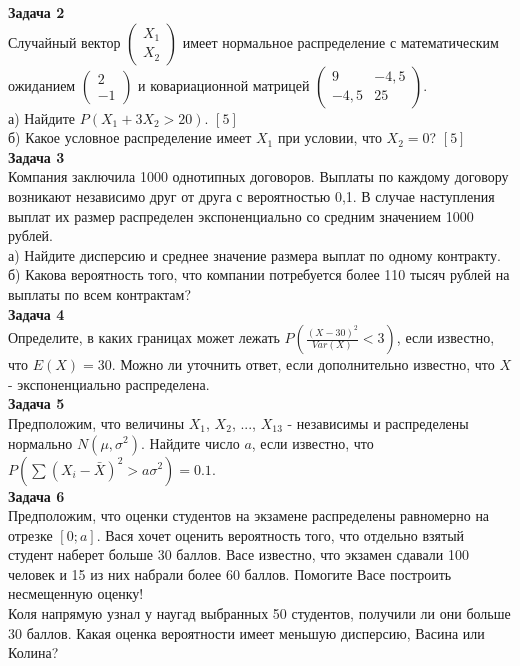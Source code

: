 \documentclass[pdftex,12pt,a4paper]{article}
\begin{document}
\textbf{Задача 2} \\ %
Случайный вектор  $\left(\begin{array}{c}
{X_{1} } \\ {X_{2} }
\end{array}\right)$  имеет нормальное распределение с
математическим ожиданием  $\left(\begin{array}{c} {2} \\ {-1}
\end{array}\right)$  и ковариационной матрицей
$\left(\begin{array}{cc} {9} & {-4,5} \\ {-4,5} & {25}
\end{array}\right)$. \\
а) Найдите  $P\left(X_{1} +3X_{2} >20\right)$. $[5]$ \\
б) Какое условное распределение имеет $X_{1}$ при условии, что $X_{2}=0$? $[5]$ \\


\textbf{Задача 3} \\ %
Компания заключила 1000 однотипных договоров. Выплаты по каждому договору возникают независимо друг от друга с вероятностью 0,1. В случае наступления выплат их размер распределен экспоненциально со средним значением 1000 рублей. \\
а) Найдите дисперсию и среднее значение размера выплат по одному контракту. \\
б) Какова вероятность того, что компании потребуется более 110 тысяч рублей на выплаты по всем контрактам? \\

\textbf{Задача 4} \\ %
Определите, в каких границах может лежать $P(\frac{(X-30)^{2}}{Var(X)}<3)$, если известно, что $E(X)=30$. Можно ли уточнить ответ, если дополнительно известно, что $X$ - экспоненциально распределена. \\

\textbf{Задача 5} \\ %
Предположим, что величины $X_{1}$, $X_{2}$, ..., $X_{13}$ - независимы и распределены нормально $N(\mu,\sigma^{2})$. Найдите число $a$, если известно, что $P( \sum (X_{i}-\bar{X})^{2}>a\sigma^{2})=0.1$. \\

\textbf{Задача 6} \\
Предположим, что оценки студентов на экзамене распределены равномерно на отрезке $[0;a]$. Вася хочет оценить вероятность того, что отдельно взятый студент наберет больше 30 баллов. Васе известно, что экзамен сдавали 100 человек и 15 из них набрали более 60 баллов. Помогите Васе построить несмещенную оценку! \\
Коля напрямую узнал у наугад выбранных 50 студентов, получили ли они больше 30 баллов. Какая оценка вероятности имеет меньшую дисперсию, Васина или Колина? \\
\end{document}
